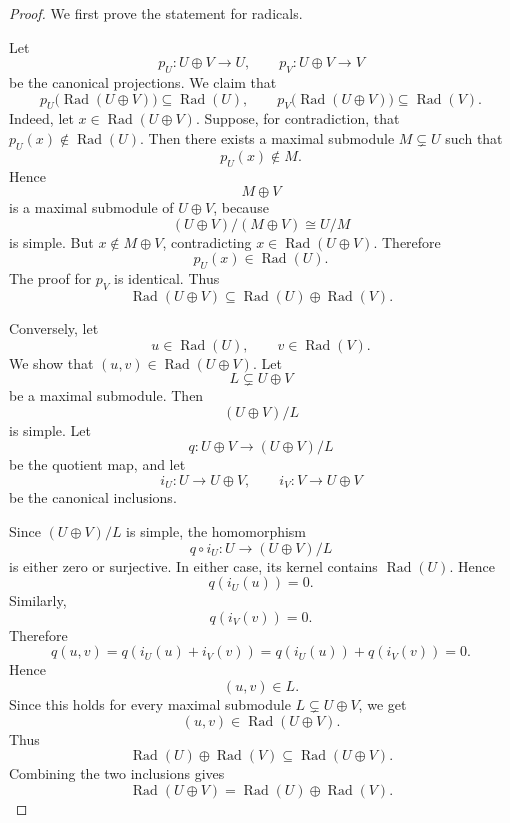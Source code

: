 \begin{proof}
    We first prove the statement for radicals.

    Let
    \[
        p_U:U\oplus V\longrightarrow U,
        \qquad
        p_V:U\oplus V\longrightarrow V
    \]
    be the canonical projections. We claim that
    \[
        p_U\bigl(\operatorname{Rad}(U\oplus V)\bigr)
        \subseteq \operatorname{Rad}(U),
        \qquad
        p_V\bigl(\operatorname{Rad}(U\oplus V)\bigr)
        \subseteq \operatorname{Rad}(V).
    \]
    Indeed, let \(x\in \operatorname{Rad}(U\oplus V)\). Suppose, for contradiction, that
    \(p_U(x)\notin \operatorname{Rad}(U)\). Then there exists a maximal submodule
    \(M\subsetneq U\) such that
    \[
        p_U(x)\notin M.
    \]
    Hence
    \[
        M\oplus V
    \]
    is a maximal submodule of \(U\oplus V\), because
    \[
        (U\oplus V)/(M\oplus V)\cong U/M
    \]
    is simple. But \(x\notin M\oplus V\), contradicting
    \(x\in \operatorname{Rad}(U\oplus V)\). Therefore
    \[
        p_U(x)\in \operatorname{Rad}(U).
    \]
    The proof for \(p_V\) is identical. Thus
    \[
        \operatorname{Rad}(U\oplus V)
        \subseteq
        \operatorname{Rad}(U)\oplus \operatorname{Rad}(V).
    \]

    Conversely, let
    \[
        u\in \operatorname{Rad}(U),
        \qquad
        v\in \operatorname{Rad}(V).
    \]
    We show that \((u,v)\in \operatorname{Rad}(U\oplus V)\). Let
    \[
        L\subsetneq U\oplus V
    \]
    be a maximal submodule. Then
    \[
        (U\oplus V)/L
    \]
    is simple. Let
    \[
        q:U\oplus V\longrightarrow (U\oplus V)/L
    \]
    be the quotient map, and let
    \[
        i_U:U\longrightarrow U\oplus V,
        \qquad
        i_V:V\longrightarrow U\oplus V
    \]
    be the canonical inclusions.

    Since \((U\oplus V)/L\) is simple, the homomorphism
    \[
        q\circ i_U:U\longrightarrow (U\oplus V)/L
    \]
    is either zero or surjective. In either case, its kernel contains
    \(\operatorname{Rad}(U)\). Hence
    \[
        q(i_U(u))=0.
    \]
    Similarly,
    \[
        q(i_V(v))=0.
    \]
    Therefore
    \[
        q(u,v)
        =
        q(i_U(u)+i_V(v))
        =
        q(i_U(u))+q(i_V(v))
        =
        0.
    \]
    Hence
    \[
        (u,v)\in L.
    \]
    Since this holds for every maximal submodule \(L\subsetneq U\oplus V\), we get
    \[
        (u,v)\in \operatorname{Rad}(U\oplus V).
    \]
    Thus
    \[
        \operatorname{Rad}(U)\oplus \operatorname{Rad}(V)
        \subseteq
        \operatorname{Rad}(U\oplus V).
    \]
    Combining the two inclusions gives
    \[
        \operatorname{Rad}(U\oplus V)
        =
        \operatorname{Rad}(U)\oplus \operatorname{Rad}(V).
    \]


\end{proof}
